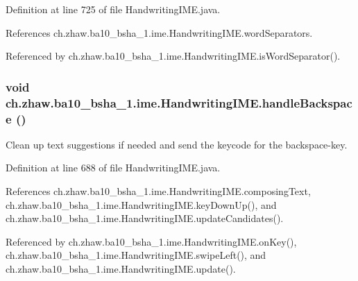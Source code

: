 Definition at line 725 of file HandwritingIME.java.

References ch.zhaw.ba10\_\-bsha\_\-1.ime.HandwritingIME.wordSeparators.

Referenced by ch.zhaw.ba10\_\-bsha\_\-1.ime.HandwritingIME.isWordSeparator().\hypertarget{classch_1_1zhaw_1_1ba10__bsha__1_1_1ime_1_1HandwritingIME_a629b38e45bc795d46cb7ce1c79bc1def}{
\subsubsection[{handleBackspace}]{\setlength{\rightskip}{0pt plus 5cm}void ch.zhaw.ba10\_\-bsha\_\-1.ime.HandwritingIME.handleBackspace ()}}
\label{classch_1_1zhaw_1_1ba10__bsha__1_1_1ime_1_1HandwritingIME_a629b38e45bc795d46cb7ce1c79bc1def}
Clean up text suggestions if needed and send the keycode for the backspace-\/key. 

Definition at line 688 of file HandwritingIME.java.

References ch.zhaw.ba10\_\-bsha\_\-1.ime.HandwritingIME.composingText, ch.zhaw.ba10\_\-bsha\_\-1.ime.HandwritingIME.keyDownUp(), and ch.zhaw.ba10\_\-bsha\_\-1.ime.HandwritingIME.updateCandidates().

Referenced by ch.zhaw.ba10\_\-bsha\_\-1.ime.HandwritingIME.onKey(), ch.zhaw.ba10\_\-bsha\_\-1.ime.HandwritingIME.swipeLeft(), and ch.zhaw.ba10\_\-bsha\_\-1.ime.HandwritingIME.update().

